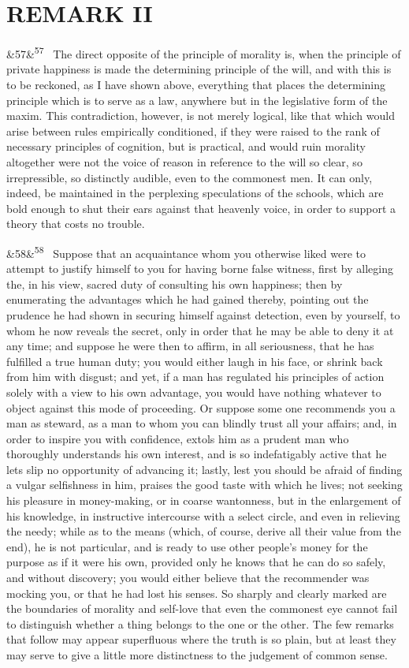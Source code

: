\documentclass[12pt]{article}
\newcommand{\para}[1][]{\par\noindent\ifx&#1&\else\textsuperscript{\footnotesize #1}~\fi}
\begin{document}
\section*{REMARK II}

\para[57] The direct opposite of the principle of morality is, when the principle of private happiness is made the determining principle of the will, and with this is to be reckoned, as I have shown above, everything that places the determining principle which is to serve as a law, anywhere but in the legislative form of the maxim. This contradiction, however, is not merely logical, like that which would arise between rules empirically conditioned, if they were raised to the rank of necessary principles of cognition, but is practical, and would ruin morality altogether were not the voice of reason in reference to the will so clear, so irrepressible, so distinctly audible, even to the commonest men. It can only, indeed, be maintained in the perplexing speculations of the schools, which are bold enough to shut their ears against that heavenly voice, in order to support a theory that costs no trouble.

\para[58] Suppose that an acquaintance whom you otherwise liked were to attempt to justify himself to you for having borne false witness, first by alleging the, in his view, sacred duty of consulting his own happiness; then by enumerating the advantages which he had gained thereby, pointing out the prudence he had shown in securing himself against detection, even by yourself, to whom he now reveals the secret, only in order that he may be able to deny it at any time; and suppose he were then to affirm, in all seriousness, that he has fulfilled a true human duty; you would either laugh in his face, or shrink back from him with disgust; and yet, if a man has regulated his principles of action solely with a view to his own advantage, you would have nothing whatever to object against this mode of proceeding. Or suppose some one recommends you a man as steward, as a man to whom you can blindly trust all your affairs; and, in order to inspire you with confidence, extols him as a prudent man who thoroughly understands his own interest, and is so indefatigably active that he lets slip no opportunity of advancing it; lastly, lest you should be afraid of finding a vulgar selfishness in him, praises the good taste with which he lives; not seeking his pleasure in money-making, or in coarse wantonness, but in the enlargement of his knowledge, in instructive intercourse with a select circle, and even in relieving the needy; while as to the means (which, of course, derive all their value from the end), he is not particular, and is ready to use other people's money for the purpose as if it were his own, provided only he knows that he can do so safely, and without discovery; you would either believe that the recommender was mocking you, or that he had lost his senses. So sharply and clearly marked are the boundaries of morality and self-love that even the commonest eye cannot fail to distinguish whether a thing belongs to the one or the other. The few remarks that follow may appear superfluous where the truth is so plain, but at least they may serve to give a little more distinctness to the judgement of common sense.
\end{document}

